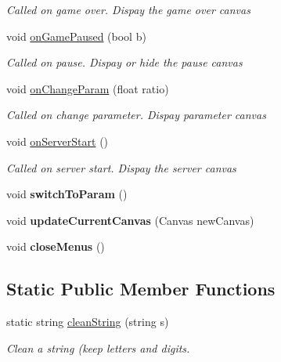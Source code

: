 \begin{DoxyCompactItemize}
\begin{DoxyCompactList}\small\item\em Called on game over. Dispay the game over canvas\end{DoxyCompactList}\item 
void \hyperlink{class_u_i_aa21043b31d464b1db1710ebb553650af}{on\-Game\-Paused} (bool b)
\begin{DoxyCompactList}\small\item\em Called on pause. Dispay or hide the pause canvas\end{DoxyCompactList}\item 
void \hyperlink{class_u_i_abf4d14bfb26297856c38b0abc2712eb4}{on\-Change\-Param} (float ratio)
\begin{DoxyCompactList}\small\item\em Called on change parameter. Dispay parameter canvas\end{DoxyCompactList}\item 
void \hyperlink{class_u_i_a44fedb78ec880cf6ddbec26d99ed9daf}{on\-Server\-Start} ()
\begin{DoxyCompactList}\small\item\em Called on server start. Dispay the server canvas\end{DoxyCompactList}\item 
\hypertarget{class_u_i_a06d9a6a254e8ebc40a53efb66474922f}{void {\bfseries switch\-To\-Param} ()}\label{class_u_i_a06d9a6a254e8ebc40a53efb66474922f}

\item 
\hypertarget{class_u_i_a01eed516e5a54b24a0fde23914424eb0}{void {\bfseries update\-Current\-Canvas} (Canvas new\-Canvas)}\label{class_u_i_a01eed516e5a54b24a0fde23914424eb0}

\item 
\hypertarget{class_u_i_a5137ba7cd568f596078e9a59fe5d559f}{void {\bfseries close\-Menus} ()}\label{class_u_i_a5137ba7cd568f596078e9a59fe5d559f}

\end{DoxyCompactItemize}
\subsection*{Static Public Member Functions}
\begin{DoxyCompactItemize}
\item 
static string \hyperlink{class_u_i_a25e765d3967a10fde8a8becc5522551e}{clean\-String} (string s)
\begin{DoxyCompactList}\small\item\em Clean a string (keep letters and digits.\end{DoxyCompactList}\end{DoxyCompactItemize}
